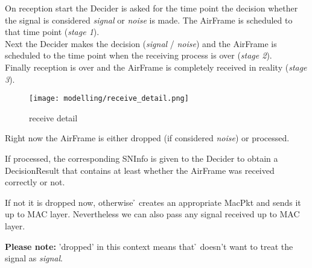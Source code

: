On reception start the Decider is asked for the time point the decision whether the signal is considered \textit{signal} or \textit{noise} is made. The AirFrame is scheduled to that time point (\textit{stage 1}).\\

Next the Decider makes the decision (\textit{signal} / \textit{noise}) and the AirFrame is scheduled to the time point when the receiving process is over (\textit{stage 2}).\\

Finally reception is over and the AirFrame is completely received in reality (\textit{stage 3}).

\begin{figure}[H]
 \centering
 \texttt{[image: modelling/receive\_detail.png]}
 \caption{receive detail}
 \label{fig: receive detail}
\end{figure}

Right now the AirFrame is either dropped (if considered \textit{noise}) or processed.

If processed, the corresponding SNInfo is given to the Decider to obtain a DecisionResult that contains at least whether the AirFrame was received correctly or not.

If not it is dropped now, otherwise \h{\bp} creates an appropriate MacPkt and sends it up to MAC layer. Nevertheless we can also pass any signal received up to MAC layer.

\textbf{Please note:} 'dropped' in this context means that \h{\bp} doesn't want to treat the signal as \textit{signal}.








